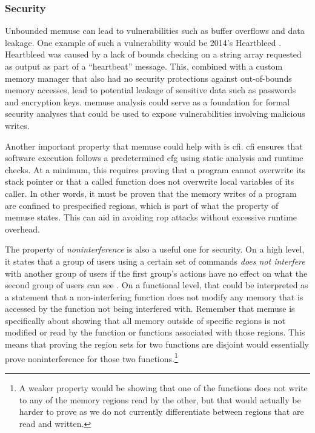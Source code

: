\subsubsection{Security}
Unbounded \gls{memuse} can lead to vulnerabilities such as buffer overflows and data leakage.
One example of such a vulnerability would be 2014's Heartbleed \autocite{heartbleed}.
Heartbleed was caused by a lack of bounds checking on a string array requested as output as part of a ``heartbeat'' message.
This, combined with a custom memory manager that also had no security protections against out-of-bounds memory accesses, lead to potential leakage of sensitive data such as passwords and encryption keys.
\Gls{memuse} analysis could serve as a foundation for formal security analyses that could be used to expose vulnerabilities involving malicious writes.

Another important property that \gls{memuse} could help with is \ac{cfi}.
\Ac{cfi} ensures that software execution follows a predetermined \ac{cfg} using static analysis and runtime checks.
At a minimum, this requires proving that a program cannot overwrite its stack pointer or that a called function does not overwrite local variables of its caller.
In other words, it must be proven that the memory writes of a program are confined to prespecified regions, which is part of what the property of \gls{memuse} states.
This can aid in avoiding \ac{rop} attacks without excessive runtime overhead.

The property of \emph{noninterference} is also a useful one for security.
On a high level, it states that a group of users using a certain set of commands \emph{does not interfere} with another group of users if the first group's actions have no effect on what the second group of users can see
\autocite{goguen1982security,rushby1992noninterference}.
On a functional level, that could be interpreted as a statement that a non-interfering function does not modify any memory that is accessed by the function not being interfered with.
Remember that \gls{memuse} is specifically about showing that all memory outside of specific regions is not modified or read by the function or functions associated with those regions.
This means that proving the region sets for two functions are disjoint would essentially prove noninterference for those two functions.\footnote{%
  A weaker property would be showing that one of the functions does not write
  to any of the memory regions read by the other, but that would actually be harder to prove as we do not currently differentiate between regions that are read and written.%
}

